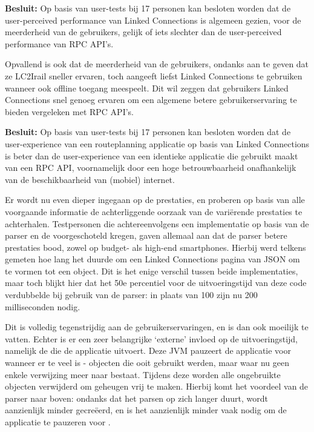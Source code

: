 \textbf{Besluit:} Op basis van user-tests bij 17 personen kan besloten worden dat de user-perceived performance van Linked Connections is algemeen gezien, voor de meerderheid van de gebruikers, gelijk of iets slechter dan de user-perceived performance van RPC API's.

Opvallend is ook dat de meerderheid van de gebruikers, ondanks aan te geven dat ze LC2Irail sneller ervaren, toch aangeeft liefst Linked Connections te gebruiken wanneer ook offline toegang meespeelt. Dit wil zeggen dat gebruikers Linked Connections snel genoeg ervaren om een algemene betere gebruikerservaring te bieden vergeleken met RPC API's.

\textbf{Besluit:} Op basis van user-tests bij 17 personen kan besloten worden dat de user-experience van een routeplanning applicatie op basis van Linked Connections is beter dan de user-experience van een identieke applicatie die gebruikt maakt van een RPC API, voornamelijk door een hoge betrouwbaarheid onafhankelijk van de beschikbaarheid van (mobiel) internet.

Er wordt nu even dieper ingegaan op de prestaties, en proberen op basis van alle voorgaande informatie de achterliggende oorzaak van de variërende prestaties te achterhalen. Testpersonen die achtereenvolgens een implementatie op basis van de  parser en de  voorgeschoteld kregen, gaven allemaal aan dat de  parser betere prestaties bood, zowel op budget- als high-end smartphones. Hierbij werd telkens gemeten hoe lang het duurde om een Linked Connections pagina van JSON om te vormen tot een object. Dit is het enige verschil tussen beide implementaties, maar toch blijkt hier dat het 50e percentiel voor de uitvoeringstijd van deze code verdubbelde bij gebruik van de  parser: in plaats van 100 zijn nu 200 milliseconden nodig.

Dit is volledig tegenstrijdig aan de gebruikerservaringen, en is dan ook moeilijk te vatten. Echter is er een zeer belangrijke `externe' invloed op de uitvoeringstijd, namelijk de  die de applicatie uitvoert. Deze JVM pauzeert de applicatie voor  wanneer er te veel  is - objecten die ooit gebruikt werden, maar waar nu geen enkele verwijzing meer naar bestaat. Tijdens deze  worden alle ongebruikte objecten verwijderd om geheugen vrij te maken. Hierbij komt het voordeel van de  parser naar boven: ondanks dat het parsen op zich langer duurt, wordt aanzienlijk minder  gecreëerd, en is het aanzienlijk minder vaak nodig om de applicatie te pauzeren voor .

